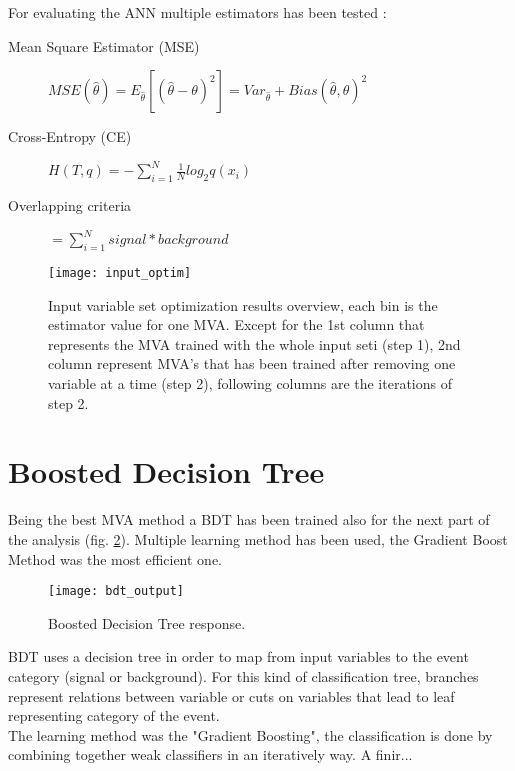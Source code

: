For evaluating the ANN multiple estimators has been tested :
\begin{description}
	\item [Mean Square Estimator (MSE)] $ MSE(\hat{\theta}) = E_{\hat{\theta}} [(\hat{\theta} - \theta)^2] =
    Var_{\hat{\theta}} + Bias(\hat{\theta}, \theta)^2$
	\item [Cross-Entropy (CE)] $ H(T,q) = -\sum_{i=1}^{N}{\frac{1}{N} log_2 q(x_i)}$
	\item [Overlapping criteria] $ = \sum_{i=1}^{N}{signal*background}$
\end{description}

\begin{figure}[h!]
    \texttt{[image: input\_optim]}
    \caption{Input variable set optimization results overview, each bin is the estimator value for one MVA. Except for
    the 1st column that represents the MVA trained with the whole input seti (step 1), 2nd column
    represent MVA's that has been trained after removing one variable at a time (step 2), following columns are the
    iterations of step 2.}
    \label{input_optim}
\end{figure}


\section{Boosted Decision Tree}

Being the best MVA method a BDT has been trained also for the next part of the analysis (fig. \ref{bdt_output}).
Multiple learning method has been used, the Gradient Boost Method was the most efficient one.
\begin{figure}[h!]
\centering
    \texttt{[image: bdt\_output]}
    \caption{Boosted Decision Tree response.}
    \label{bdt_output}
\end{figure}


BDT uses a decision tree in order to map from input variables to the event category (signal or background).
For this kind of classification tree, branches represent relations between variable or cuts on variables that lead to leaf representing category of the event.\\
The learning method was the "Gradient Boosting", the classification is done by combining together weak classifiers in an iteratively way.
A finir...


